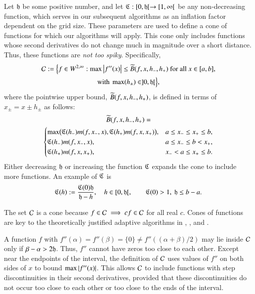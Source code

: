 \documentclass[review]{elsarticle}
\makeatletter
\newcommand{\Vast}{\bBigg@{6}}
\theoremstyle{definition}
\newcommand{\Vastr}{\mathclose\Vast}
\renewcommand{\cw}{W}
\makeatother
\begin{document}
Let $\mathfrak{h}$ be some positive number, and let $\mathfrak{C} : [0,\mathfrak{h}[ \to [1,\infty[$ be any
non-decreasing function, which serves in our subsequent algorithms as an
inflation factor dependent on the grid size. These parameters are used to define
a cone of functions for which our algorithms will apply. This cone only includes
functions whose second derivatives do not change much in magnitude over a short
distance. Thus, these functions are \emph{not too spiky}. Specifically,
\begin{multline} \label{conedef}
 \cc :=   \Bigl \{
 f  \in    \cw^{2,\infty}:   \max\abs{f''(x)}  \le \tB(f,x,h_-,h_+)  \text{ for all } x \in [a,b],
\\ \text{with }  \max(h_{\pm}) \in ]0, \fh[  \Bigr \},
\end{multline}
where the pointwise upper bound, $\widetilde{B}(f,x,h_-,h_+)$, is defined in terms of
$x_{\pm} =x \pm h_{\pm}$ as follows:
\begin{multline*}
\tB(f,x,h_-,h_+)=\\
\begin{cases}
  \max\bigl(\fC(h_{-}) m(f,x_-,x),\fC(h_{+}) m(f,x,x_+)\bigr), & a \le x_- \le x_+ \le b,\\
\fC(h_{-}) m(f,x_-,x), & a \le x_- \le b <  x_+,\\
\fC(h_{+}) m(f,x,x_+), & x_- < a \le x_+ \le b.
\end{cases} %
\end{multline*}
Either decreasing $\mathfrak{h}$ or increasing the function $\mathfrak{C}$ expands the cone to
include more functions. An example of $\mathfrak{C}$ is
\begin{equation} \label{sampleC}
\mathfrak{C}(h) : = \frac{\mathfrak{C}(0) \mathfrak{h}}{\mathfrak{h} - h}, \quad h \in [0,\mathfrak{h}[, \qquad \mathfrak{C}(0) > 1,\ \mathfrak{h} \le b - a.
\end{equation}

The set $\mathcal{C}$ is a cone because $f \in \mathcal{C} \implies cf \in \mathcal{C}$ for all real $c$.
Cones of functions are key to the theoretically justified adaptive algorithms in
\cite{HicEtal14b}, \cite{Din15a}, and \cite{Ton14a}.

A function $f$ with $f''(\alpha) = f''(\beta) = \{0\} \ne f''((\alpha+\beta)/2)$
may lie inside $\mathcal{C}$ only if $\beta - \alpha > 2\mathfrak{h}$. Thus, $f''$ cannot have
zeros too close to each other. Except near the endpoints of the interval, the
definition of $\mathcal{C}$ uses values of $f''$ on both sides of $x$ to bound $\max
\left \lvert f''(x) \right \rvert$. This allows $\mathcal{C}$ to include functions with step discontinuities
in their second derivatives, provided that these discontinuities do not occur
too close to each other or too close to the ends of the interval.
\end{document}
